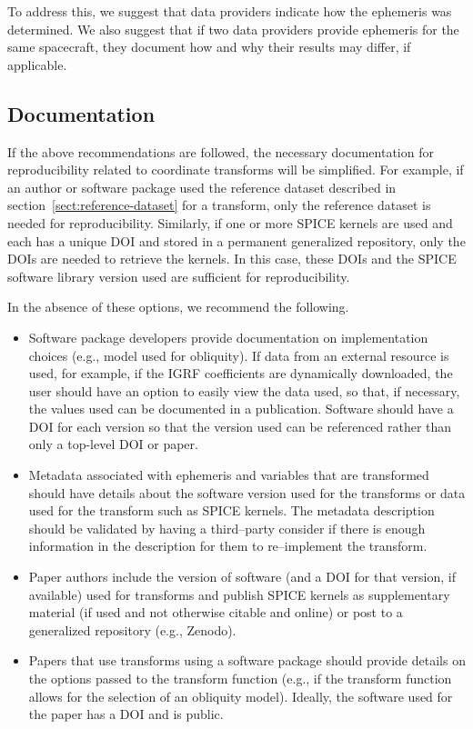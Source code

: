 \documentclass[draft]{agujournal2019}
\begin{document}
To address this, we suggest that data providers indicate how the ephemeris was determined. We also suggest that if two data providers provide ephemeris for the same spacecraft, they document how and why their results may differ, if applicable.

\subsection{Documentation}

If the above recommendations are followed, the necessary documentation for reproducibility related to coordinate transforms will be simplified. For example, if an author or software package used the reference dataset described in section~\ref{sect:reference-dataset} for a transform, only the reference dataset is needed for reproducibility. Similarly, if one or more SPICE kernels are used and each has a unique DOI and stored in a permanent generalized repository, only the DOIs are needed to retrieve the kernels. In this case, these DOIs and the SPICE software library version used are sufficient for reproducibility.

In the absence of these options, we recommend the following.

\begin{itemize}
  \item Software package developers provide documentation on implementation choices (e.g., model used for obliquity). If data from an external resource is used, for example, if the IGRF coefficients are dynamically downloaded, the user should have an option to easily view the data used, so that, if necessary, the values used can be documented in a publication.
  Software should have a DOI for each version so that the version used can be referenced rather than only a top-level DOI or paper.
  \item Metadata associated with ephemeris and variables that are transformed should have details about the software version used for the transforms or data used for the transform such as SPICE kernels. The metadata description should be validated by having a third--party consider if there is enough information in the description for them to re--implement the transform.
  \item Paper authors include the version of software (and a DOI for that version, if available) used for transforms and publish SPICE kernels as supplementary material (if used and not otherwise citable and online) or post to a generalized repository (e.g., Zenodo). 
  \item Papers that use transforms using a software package should provide details on the options passed to the transform function (e.g., if the transform function allows for the selection of an obliquity model). Ideally, the software used for the paper has a DOI and is public.

\end{itemize}
\end{document}
